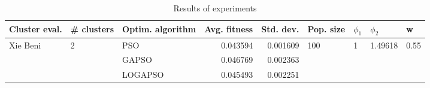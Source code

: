 \begin{table}
\centering
\caption{Results of experiments}
\begin{tabular}{lllrrllll}
\toprule
            Cluster eval. &        \# clusters & Optim. algorithm &  Avg. fitness &  Std. dev. &            Pop. size &         $\phi_{1}$ &               $\phi_{2}$ &                     w \\
\midrule
\multirow{3}{*}{Xie Beni} & \multirow{3}{*}{2} &              PSO &      0.043594 &   0.001609 & \multirow{3}{*}{100} & \multirow{3}{*}{1} & \multirow{3}{*}{1.49618} & \multirow{3}{*}{0.55} \\
                          &                    &            GAPSO &      0.046769 &   0.002363 &                      &                    &                          &                       \\
                          &                    &          LOGAPSO &      0.045493 &   0.002251 &                      &                    &                          &                       \\
\bottomrule
\end{tabular}
\end{table}
